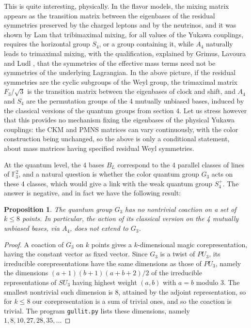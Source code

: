 \documentclass[11pt]{amsart}
\newtheorem{proposition}[theorem]{Proposition}
\theoremstyle{definition}
\begin{document}
This is quite interesting, physically. In the flavor models, the mixing matrix appears as the transition matrix between the eigenbases of the residual symmetries preserved by the charged leptons and by the neutrinos, and it was shown by Lam \cite{lam} that tribimaximal mixing, for all values of the Yukawa couplings, requires the horizontal group $S_4$, or a group containing it, while $A_4$ naturally leads to trimaximal mixing, with the qualification, explained by Grimus, Lavoura and Ludl \cite{gll}, that the symmetries of the effective mass terms need not be symmetries of the underlying Lagrangian. In the above picture, if the residual symmetries are the cyclic subgroups of the Weyl group, the trimaximal matrix $F_3/\sqrt{3}$ is the transition matrix between the eigenbases of clock and shift, and $A_4$ and $S_4$ are the permutation groups of the 4 mutually unbiased bases, induced by the classical versions of the quantum groups from section 4. Let us stress however that this provides no mechanism fixing the eigenbases of the physical Yukawa couplings: the CKM and PMNS matrices can vary continuously, with the color construction being unchanged, so the above is only a conditional statement, about mass matrices having specified residual Weyl symmetries.

At the quantum level, the 4 bases $B_L$ correspond to the 4 parallel classes of lines of $\mathbb F_3^2$, and a natural question is whether the color quantum group $G_3$ acts on these 4 classes, which would give a link with the weak quantum group $S_4^+$. The answer is negative, and in fact we have the following result:

\begin{proposition}
The quantum group $G_3$ has no nontrivial coaction on a set of $k\leq8$ points. In particular, the action of its classical version on the 4 mutually unbiased bases, via $A_4$, does not extend to $G_3$.
\end{proposition}

\begin{proof}
A coaction of $G_3$ on $k$ points gives a $k$-dimensional magic corepresentation, having the constant vector as fixed vector. Since $G_3$ is a twist of $PU_3$, its irreducible corepresentations have the same dimensions as those of $PU_3$, namely the dimensions $(a+1)(b+1)(a+b+2)/2$ of the irreducible representations of $SU_3$ having highest weight $(a,b)$ with $a=b$ modulo 3. The smallest nontrivial such dimension is $8$, attained by the adjoint representation, so for $k\leq8$ our corepresentation is a sum of trivial ones, and so the coaction is trivial. The program {\tt gullit.py} lists these dimensions, namely $1,8,10,27,28,35,\ldots$
\end{proof}
\end{document}
